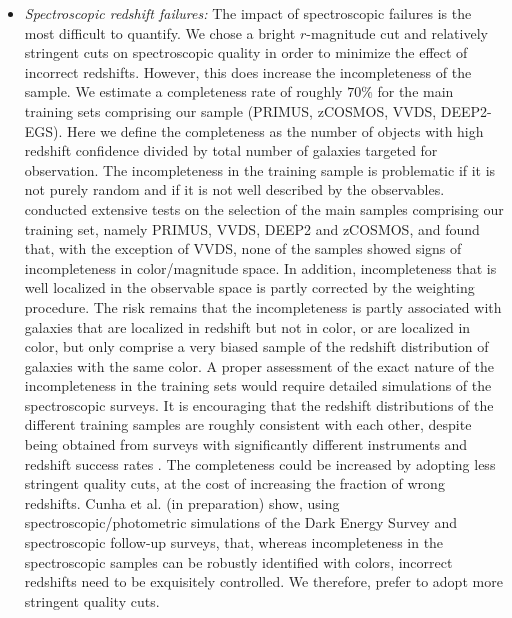 \documentclass[12pt,preprint]{aastex}
\begin{document}
\begin{itemize}
\item {\it Spectroscopic redshift failures: } The impact of spectroscopic
failures is the most difficult to quantify.  We chose a bright $r$-magnitude
cut and relatively stringent cuts on spectroscopic quality in order to minimize
the effect of incorrect redshifts. However, this does increase the
incompleteness of the sample.  We estimate a completeness rate of roughly
$70\%$ for the main training sets comprising our sample (PRIMUS, zCOSMOS, VVDS,
DEEP2-EGS).  Here we define the completeness as the number of objects with high
redshift confidence divided by total number of galaxies targeted for
observation. The incompleteness in the training sample is problematic if it is
not purely random and if it is not well described by the observables.
\cite{Nakajima11} conducted extensive tests on the selection of the main
samples comprising our training set, namely PRIMUS, VVDS, DEEP2 and zCOSMOS,
and found that, with the exception of VVDS, none of the samples showed signs of
incompleteness in color/magnitude space. In addition, incompleteness that is
well localized in the observable space is partly corrected by the weighting
procedure. The risk remains that the incompleteness is partly associated with
galaxies that are localized in redshift but not in color, or are localized in
color, but only comprise a very biased sample of the redshift distribution of
galaxies with the same color. A proper assessment of the exact nature of the
incompleteness in the training sets would require detailed simulations of the
spectroscopic surveys.  It is encouraging that the redshift distributions of
the different training samples are roughly consistent with each other, despite
being obtained from surveys with significantly different instruments and
redshift success rates \citep[Fig.  7 of][]{Nakajima11}.  The completeness
could be increased by adopting less stringent quality cuts, at the cost of
increasing the fraction of wrong redshifts.  Cunha et al. (in preparation)
show, using spectroscopic/photometric simulations of the Dark Energy Survey and
spectroscopic follow-up surveys, that, whereas incompleteness in the
spectroscopic samples can be robustly identified with colors, incorrect
redshifts need to be exquisitely controlled.  We therefore, prefer to adopt
more stringent quality cuts.




\end{itemize}
\end{document}
